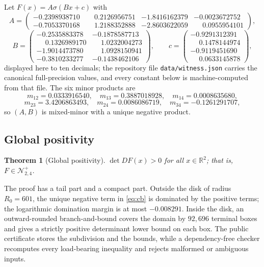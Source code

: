 \documentclass[11pt]{article}
\newtheorem{theorem}{Theorem}[section]
\theoremstyle{definition}
\theoremstyle{remark}
\newcommand{\R}{\mathbb{R}}
\begin{document}
Let $F(x)=A\sigma(Bx+c)$ with
\[
A=\begin{pmatrix}
-0.2398938710 & \phantom{-}0.2126956751 & -1.8416162379 & -0.0023672752\\
-0.7053370168 & \phantom{-}1.2188352888 & -2.8603622059 & \phantom{-}0.0955954101
\end{pmatrix},
\]
\[
B=\begin{pmatrix}
-0.2535883378 & -0.1878587713\\
\phantom{-}0.1326989170 & \phantom{-}1.0232004273\\
-1.9014473780 & \phantom{-}1.0928150941\\
-0.3810233277 & -0.1438462106
\end{pmatrix},
\qquad
c=\begin{pmatrix}
-0.9291312391\\ \phantom{-}0.1478144974\\ -0.9119451690\\ \phantom{-}0.0633145878
\end{pmatrix},
\]
displayed here to ten decimals; the repository file
\texttt{data/witness.json} carries the canonical full-precision values,
and every constant below is machine-computed from that file. The six minor
products are
\[
m_{12}=0.0333916540,\quad
m_{13}=0.3887018928,\quad
m_{14}=0.0008635680,
\]
\[
m_{23}=3.4206863493,\quad
m_{24}=0.0086086719,\quad
m_{34}=-0.1261291707,
\]
so $(A,B)$ is mixed-minor with a unique negative product.

\subsection{Global positivity}

\begin{theorem}[Global positivity]\label{thm:cert}
$\det DF(x)>0$ for all $x\in\R^2$; that is, $F\in\mathcal N^{+}_{2,4}$.
\end{theorem}

The proof has a tail part and a compact part. Outside the disk of radius
$R_0=601$, the unique negative term in \eqref{eq:cb} is dominated by the
positive terms; the logarithmic domination margin is at most $-0.008291$.
Inside the disk, an outward-rounded branch-and-bound covers the domain by
$92{,}696$ terminal boxes and gives a strictly positive determinant lower
bound on each box. The public certificate stores the subdivision and the
bounds, while a dependency-free checker recomputes every load-bearing
inequality and rejects malformed or ambiguous inputs.
\end{document}
